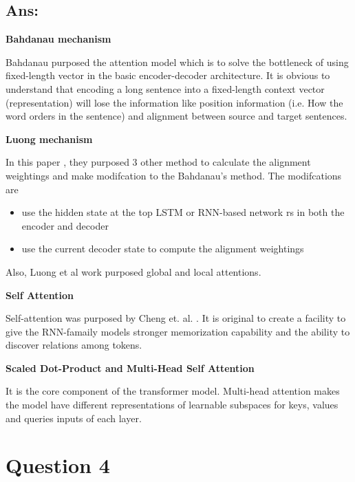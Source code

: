 \documentclass{kthreport}
\begin{document}
\subsection*{Ans:}

\textbf{Bahdanau mechanism}


Bahdanau purposed the attention model which is to solve the bottleneck of using 
fixed-length vector in the basic encoder-decoder architecture. It is obvious to understand
that encoding a long sentence into a fixed-length context vector (representation) 
will lose the information like position information (i.e. How the word orders in the sentence)
and alignment between source and target sentences.

\textbf{Luong mechanism}

In this paper \cite{luong-etal-2015-effective}, they purposed 3 other method to calculate the alignment weightings
and make modifcation to the Bahdanau's method. The modifcations are 
\begin{itemize}
    \item use the hidden state at the top LSTM or RNN-based network rs in both the encoder and decoder
    \item use the current decoder state to compute the alignment weightings
\end{itemize}

Also, Luong et al work \cite{luong-etal-2015-effective} purposed global and local attentions.

\textbf{Self Attention}

Self-attention was purposed by Cheng et. al. \cite{cheng-etal-2016-long}. It is 
original to create a facility to give the RNN-famaily models stronger memorization 
capability and the ability to discover relations among tokens.

\textbf{Scaled Dot-Product and Multi-Head Self Attention}

It is the core component of the transformer model. \cite{vaswani2017attention}
Multi-head attention makes the model have different representations of 
learnable subspaces for keys, values and queries inputs of each layer.




\section{Question 4}
\end{document}
